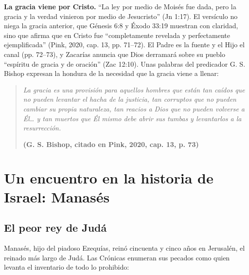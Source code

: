 \textbf{La gracia viene por Cristo.} ``La ley por medio de Moisés fue dada, pero la gracia y la verdad vinieron por medio de Jesucristo'' (Jn 1:17). El versículo no niega la gracia anterior, que Génesis 6:8 y Éxodo 33:19 muestran con claridad, sino que afirma que en Cristo fue ``completamente revelada y perfectamente ejemplificada'' (Pink, 2020, cap. 13, pp. 71--72). El Padre es la fuente y el Hijo el canal (pp. 72--73), y Zacarías anuncia que Dios derramará sobre su pueblo ``espíritu de gracia y de oración'' (Zac 12:10). Unas palabras del predicador G. S. Bishop expresan la hondura de la necesidad que la gracia viene a llenar:

\begin{quote}\itshape
La gracia es una provisión para aquellos hombres que están tan caídos que no pueden levantar el hacha de la justicia, tan corruptos que no pueden cambiar su propia naturaleza, tan reacios a Dios que no pueden volverse a Él\ldots{} y tan muertos que Él mismo debe abrir sus tumbas y levantarlos a la resurrección.\par\hfill{\upshape\small\bfseries\textcolor{azul}{(G. S. Bishop, citado en Pink, 2020, cap. 13, p. 73)}}
\end{quote}


\section{Un encuentro en la historia de Israel: Manasés}

\subsection{El peor rey de Judá}
Manasés, hijo del piadoso Ezequías, reinó cincuenta y cinco años en Jerusalén, el reinado más largo de Judá. Las Crónicas enumeran sus pecados como quien levanta el inventario de todo lo prohibido:

